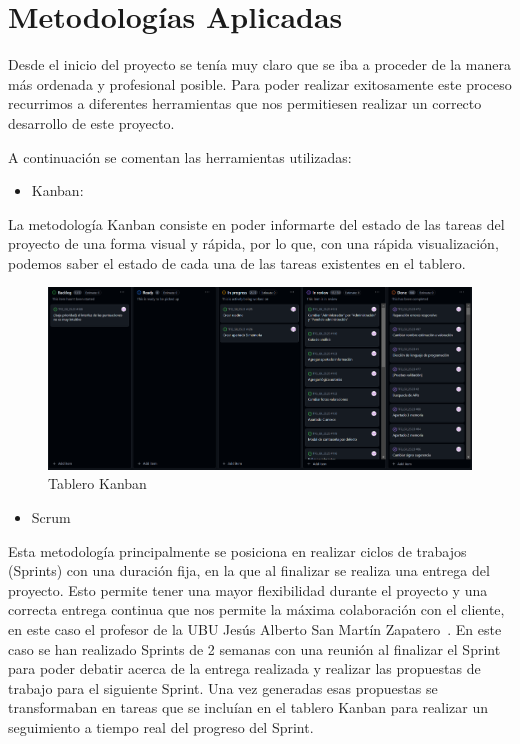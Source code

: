 
\section{Metodologías Aplicadas}

Desde el inicio del proyecto se tenía muy claro que se iba a proceder de la manera más ordenada y profesional posible. Para poder realizar exitosamente este proceso recurrimos a diferentes herramientas que nos permitiesen realizar un correcto desarrollo de este proyecto.

A continuación se comentan las herramientas utilizadas:
\begin{itemize}
    \item Kanban:
\end{itemize}
 La metodología Kanban consiste en poder informarte del estado de las tareas del proyecto de una forma visual y rápida, por lo que, con una rápida visualización, podemos saber el estado de cada una de las tareas existentes en el tablero.

 \begin{figure}[h]
     \centering
     \includegraphics[width=1\linewidth]{Imagenes/Tablero kanban.png}
     \caption{Tablero Kanban}
     \label{Tablero Kanban}
 \end{figure}
 \FloatBarrier
 \begin{itemize}
     \item Scrum
 \end{itemize}
Esta metodología principalmente se posiciona en realizar ciclos de trabajos (Sprints) con una duración fija, en la que al finalizar se realiza una entrega del proyecto. Esto permite tener una mayor flexibilidad durante el proyecto y una correcta entrega continua que nos permite la máxima colaboración con el cliente, en este caso el profesor de la UBU Jesús Alberto San Martín Zapatero~\cite{PerfilJesus}.
En este caso se han realizado Sprints de 2 semanas con una reunión al finalizar el Sprint para poder debatir acerca de la entrega realizada y realizar las propuestas de trabajo para el siguiente Sprint.
Una vez generadas esas propuestas se transformaban en tareas que se incluían en el tablero Kanban para realizar un seguimiento a tiempo real del progreso del Sprint.

